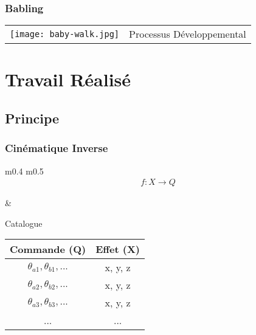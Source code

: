 \documentclass[french]{beamer}
\begin{document}

\begin{frame}
    \frametitle{Babling}

    \center
    \begin{tabular}[]{m{} m{}}
        \texttt{[image: baby-walk.jpg]}  &  \center Processus Développemental
    \end{tabular}
\end{frame}

\section{Travail Réalisé}

\subsection{Principe}

\begin{frame}
    \frametitle{Cinématique Inverse}


    \center
    \begin{tabular}{m{} m{}}
        \Large
        \begin{align}
            f: X \rightarrow Q \nonumber
        \end{align}

        &

        \center
        Catalogue

        \begin{tabular}{||c | c ||}
            \hline
            Commande (Q) & Effet (X) \\
            \hline
            $\theta_{a1}, \theta_{b1}, ...$ & x, y, z\\
            $\theta_{a2}, \theta_{b2}, ...$ & x, y, z\\
            $\theta_{a3}, \theta_{b3}, ...$ & x, y, z\\
            ... & ...\\
            \hline
        \end{tabular}
    \end{tabular}


\end{frame}
\end{document}

